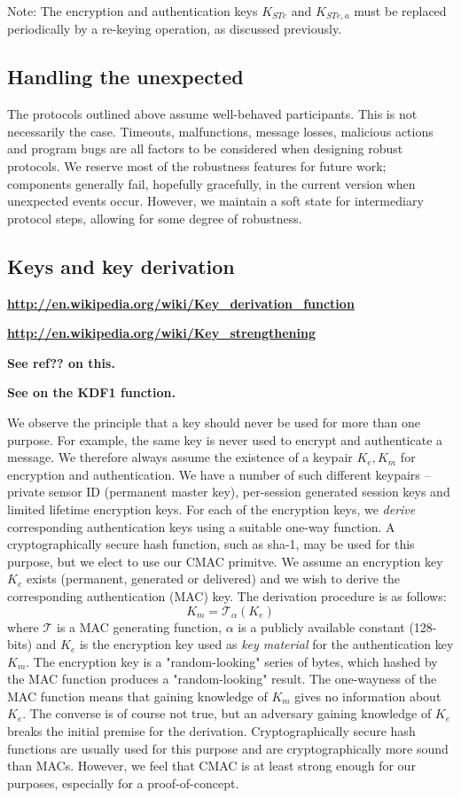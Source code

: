 Note: The encryption and authentication keys $K_{STe}$ and $K_{STe,a}$ must be replaced periodically by a re-keying operation, as discussed previously.

\subsection{Handling the unexpected}

The protocols outlined above assume well-behaved participants. This is not necessarily the case. Timeouts, malfunctions, message losses, malicious actions and program bugs are all factors to be considered when designing robust protocols. We reserve most of the robustness features for future work; components generally fail, hopefully gracefully, in the current version when unexpected events occur. However, we maintain a soft state for intermediary protocol steps, allowing for some degree of robustness. 

\subsection{Keys and key derivation}

\textbf{\url{http://en.wikipedia.org/wiki/Key_derivation_function}}

\textbf{\url{http://en.wikipedia.org/wiki/Key_strengthening}}

\textbf{See ref?? on this.}

\textbf{See \cite{ieee-1363-2000} on the KDF1 function.}

We observe the principle that a key should never be used for more than one purpose. For example, the same key is never used to encrypt and authenticate a message. We therefore always assume the existence of a keypair $K_e,K_m$ for encryption and authentication.
%
We have a number of such different keypairs -- private sensor ID (permanent master key), per-session generated session keys and limited lifetime encryption keys. For each of the encryption keys, we \textit{derive} corresponding authentication keys using a suitable one-way function. A cryptographically secure hash function, such as sha-1, may be used for this purpose, but we elect to use our CMAC primitve. We assume an encryption key $K_e$ exists (permanent, generated or delivered) and we wish to derive the corresponding authentication (MAC) key. The derivation procedure is as follows:
\[
K_m = \mathcal{T}_\alpha(K_e)
\]
where $\mathcal{T}$ is a MAC generating function, $\alpha$ is a publicly available constant (128-bits) and $K_e$ is the encryption key used as \textit{key material} for the authentication key $K_m$. The encryption key is a "random-looking" series of bytes, which hashed by the MAC function produces a "random-looking" result. The one-wayness of the MAC function means that gaining knowledge of $K_m$ gives no information about $K_e$. The converse is of course not true, but an adversary gaining knowledge of $K_e$ breaks the initial premise for the derivation. Cryptographically secure hash functions are usually used for this purpose and are cryptographically more sound than MACs. However, we feel that CMAC is at least strong enough for our purposes, especially for a proof-of-concept.

